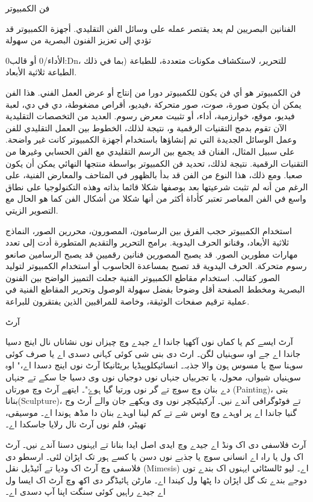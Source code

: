 \documentclass[a4paper]{article}
\begin{document}
فن الكمبيوتر

الفنانين البصريين لم يعد يقتصر عمله على وسائل الفن التقليدي. أجهزة الكمبيوتر قد تؤدي إلى تعزيز الفنون البصرية من سهولة {0الأداء{/0} أو قالب:Dn، للتحرير، لاستكشاف مكونات متعددة، للطباعة (بما في ذلك الطباعة ثلاثية الأبعاد.

فن الكمبيوتر هو أي فن يكون للكمبيوتر دورا من إنتاج أو عرض العمل الفني. هذا الفن يمكن أن يكون صورة، صوت، صور متحركة ،فيديو، أقراص مضغوطة، دي في دي، لعبة فيديو، موقع، خوارزمية، أداء، أو تثبيت معرض رسوم. العديد من التخصصات التقليدية الآن تقوم بدمج التقنيات الرقمية و، نتيجة لذلك، الخطوط بين العمل التقليدي للفن وعمل الوسائل الجديدة التي تم إنشاؤها باستخدام أجهزة الكمبيوتر كانت غير واضحة. على سبيل المثال، الفنان قد يجمع بين الرسم التقليدي مع الفن الحسابي وغيرها من التقنيات الرقمية. نتيجة لذلك، تحديد فن الكمبيوتر بواسطة منتجها النهائي يمكن أن يكون صعبا. ومع ذلك، هذا النوع من الفن قد بدأ بالظهور في المتاحف والمعارض الفنية، على الرغم من أنه لم تثبت شرعيتها بعد بوصفها شكلا قائما بذاته وهذه التكنولوجيا على نطاق واسع في الفن المعاصر تعتبر كأداة أكثر من أنها شكلا من أشكال الفن كما هو الحال مع التصوير الزيتي.

استخدام الكمبيوتر حجب الفرق بين الرسامون، المصورون، محررين الصور، النماذج ثلاثية الأبعاد، وفنانو الحرف اليدوية. برامج التحرير والتقديم المتطورة أدت إلى تعدد مهارات مطورين الصور. قد يصبح المصورين فنانين رقميين قد يصبح الرسامين صانعو رسوم متحركة. الحرف اليدوية قد تصبح بمساعدة الحاسوب أو استخدام الكمبيوتر لتوليد الصور كقالب. استخدام مقاطع الكمبيوتر الفنية جعلت التمييز الواضح بين الفنون البصرية ومخطط الصفحة أقل وضوحا بفضل سهولة الوصول وتحرير المقاطع الفنية في عملية ترقيم صفحات الوثيقة، وخاصة للمراقبين الذين يفتقرون للبراعة.



آرٹ

آرٹ ایسے کم یا کماں نوں آکھیا جاندا اے جیدے وچ چیزاں نوں نشاناں نال اینج دسیا جاندا اے جے اوہ سوہنیاں لگن۔ ارٹ دی بنی شی کوئی کہانی دسدی اے یا صرف کوئی سوہنا سچ یا مسوس ہون والا جذبہ۔ انسائیکلوپیڈیا بریٹانیکا آرٹ نوں اینج دسدا اے،" اوہ سوہنیاں شیواں، محول، یا تجربیاں جنہاں نوں دوجیاں نوں وی دسیا جا سکے تے جنہاں دے بنان وچ سوچ تے گر نوں ورتیا گیا ہوۓ"۔ ایتھے آرٹ وچ مورتاں (Painting)، بتی بنانا(Sculpture)، تے فوٹوگرافی آندے نیں۔ آرکیٹیکچر نوں وی ویکھے جان والے آرٹ وج گنیا جاندا اے پر اوہدے وچ اوس شے تے کم لینا اوہدے بنان دا مڈھ ہوندا اے۔ موسیقی، تھیٹر، فلم نوں آرٹ نال رلایا جاسکدا اے۔

آرٹ فلاسفی دی اک ونڈ اے جیدے وچ ایدی اصل ایدا بنانا تے ایہنوں دسنا آندے نیں۔ آرٹ اک ول یا راہ اے انسانی سوچ یا جذبے نوں دسن یا کسے ہور تک اپڑان لئی۔ ارسطو دی فلاسفی وچ آرٹ اک ودیا تے آئیڈیل نقل (Mimesis) اے۔ لیو ٹالسٹائی ایہنوں اک بندے توں دوجے بندے تک گل اپڑان دا پٹھا ول کیندا اے۔ مارٹن ہائیڈگر دی اکھ وچ آرٹ اک ایسا ول اے جیدے راہیں کوئی سنگت اپنا آپ دسدی اے۔



}
\end{document}
